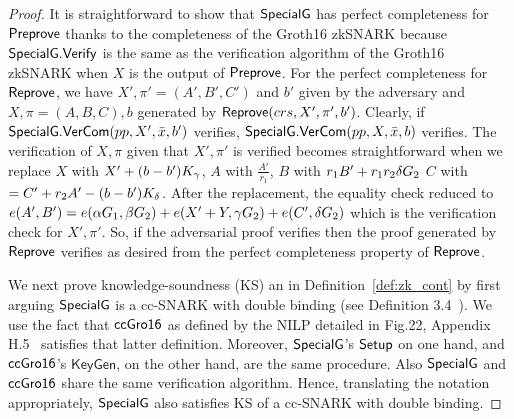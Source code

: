 \begin{proof} It is straightforward to show that ${\mathsf{SpecialG}}$ has perfect completeness for ${\mathsf{Preprove}}$ thanks to the completeness of the Groth16 zkSNARK because $ {\mathsf{SpecialG}}.{\mathsf{Verify}} $ is the same as the verification algorithm of the Groth16 zkSNARK when $ X $ is the output of $ {\mathsf{Preprove}} $.
For the perfect completeness for ${\mathsf{Reprove}}$, we have $ X', \pi' = (A',B',C') $ and $ b' $ given by the adversary and $ X,\pi =(A,B,C),b $ generated by $ {\mathsf{Reprove}}(crs, X',\pi',b') $. Clearly, if $ {\mathsf{SpecialG}}.{\mathsf{VerCom}}(pp,X',\bar{x},b') $ verifies, $ {\mathsf{SpecialG}}.{\mathsf{VerCom}}(pp,X,\bar{x},b) $ verifies. The verification of  $ X, \pi $ given that $ X',\pi' $ is verified becomes straightforward when we replace $ X $ with $ X' + (b-b')K_{\gamma} $, $ A $ with $ \frac{A'}{r_1} $, $ B $ with $ r_1 B' + r_1r_2 \delta {G}_2$ $C$ with $ = C' + r_2A'  - (b - b') K_{\delta} $. After the replacement, the equality check reduced to $ e (A',B') = e(\alpha{G}_1,\beta{G}_2) + e(X'+Y, \gamma {G}_2) + e(C', \delta{G}_2)$ which is the verification check for $ X', \pi' $. So, if the adversarial proof verifies then the proof generated by $ {\mathsf{Reprove}} $ verifies as desired from the perfect completeness property of $ {\mathsf{Reprove}} $.

We next prove knowledge-soundness (KS) an in Definition~\ref{def:zk_cont} by first arguing ${\mathsf{SpecialG}}$ is a cc-SNARK with double binding 
(see Definition 3.4~\cite{LegoSNARK}).  We use the fact that ${\mathsf{ccGro16}}$ as defined by the NILP detailed in Fig.22, Appendix H.5~\cite{LegoSNARK} 
satisfies that latter definition. Moreover, ${\mathsf{SpecialG}}$'s ${\mathsf{Setup}}$ on one hand, and ${\mathsf{ccGro16}}$'s $ \mathsf{KeyGen} $, on the other hand, are the same 
procedure. Also ${\mathsf{SpecialG}}$ and ${\mathsf{ccGro16}}$ share the same verification algorithm. Hence, translating the notation appropriately, ${\mathsf{SpecialG}}$ also 
satisfies KS of a cc-SNARK with double binding. 


\end{proof}
